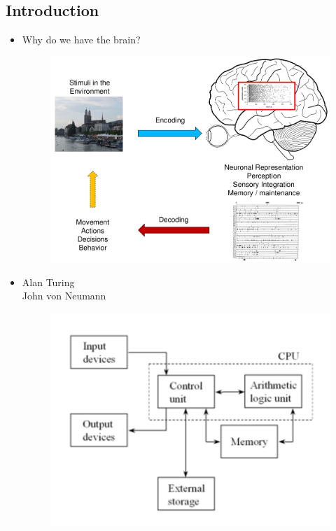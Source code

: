 \documentclass[english,11pt]{article}
\begin{document}
\subsection{Introduction}
\begin{itemize}

\item Why do we have the brain?

\begin{figure}[htbp]
\centering
  \includegraphics[scale=0.45]{images/1_1.jpg}
  \label{fig:1_1}
\end{figure} 

\item Alan Turing \\
John von Neumann

\begin{figure}[htbp]
\centering
  \includegraphics[scale=0.6]{images/1_2.jpg}
  \label{fig:1_2}
\end{figure} 


\end{itemize}
\end{document}
